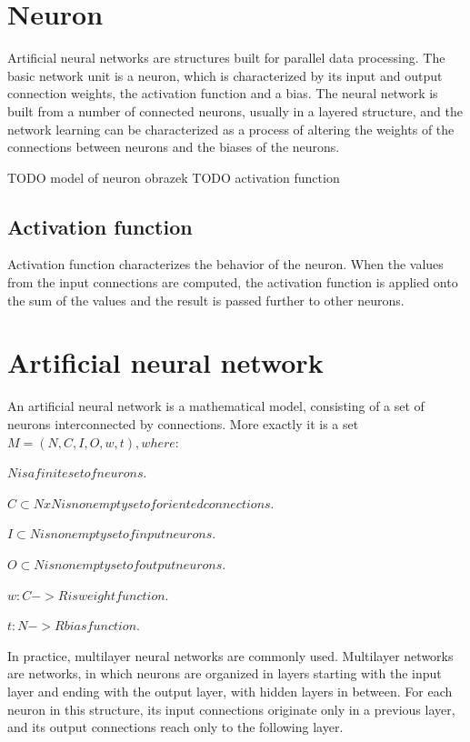 \section{Neuron}
Artificial neural networks are structures built for parallel data processing. The basic network unit is a neuron, which is characterized by its input and output connection weights, the activation function and a bias. The neural network is built from a number of connected neurons, usually in a layered structure, and the network learning can be characterized as a process of altering the weights of the connections between neurons and the biases of the neurons.

TODO model of neuron obrazek
TODO activation function
\subsection{Activation function}
Activation function characterizes the behavior of the neuron. When the values from the input connections are computed, the activation function is applied onto the sum of the values and the result is passed further to other neurons.

\section{Artificial neural network}
An artificial neural network is a mathematical model, consisting of a set of neurons interconnected by connections.
More exactly it is a set 
$M  =  (N,C,I,O,w,t),  where: $
\begin{description}
\item $N  is  a  finite  set  of  neurons.$
\item $C \subset N x N  is  nonempty  set  of  oriented  connections.$
\item $I \subset N  is  nonempty  set  of  input  neurons.$
\item $O \subset N  is  nonempty  set  of  output  neurons.$
\item $w : C -> R  is  weight  function.$
\item $t : N->R  bias  function.$
\end{description}

In practice, multilayer neural networks are commonly used. Multilayer networks are networks, in which neurons are organized in layers starting with the input layer and ending with the output layer, with hidden layers in between. For each neuron in this structure, its input connections originate only in a previous layer, and its output connections reach only to the following layer. 

